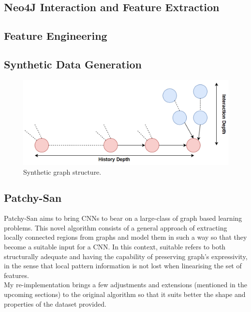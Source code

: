 \subsection{Neo4J Interaction and Feature Extraction}
\subsection{Feature Engineering}
\subsection{Synthetic Data Generation} \label{Synthetic Data Generation}

\begin{figure}[H]
  \centering
  \centerline{\includegraphics[scale = 0.35]{Images/synth_dataset.png}}
  \caption{Synthetic graph structure.}
  \label{synth_dataset}
\end{figure}

\subsection{Patchy-San}

Patchy-San aims to bring CNNs to bear on a large-class of graph based learning problems. This novel algorithm consists of a general approach of extracting locally connected regions from graphs and model them in such a way so that they become a suitable input for a CNN. In this context, suitable refers to both structurally adequate and having the capability of preserving graph's expressivity, in the sense that local pattern information is not lost when linearising the set of features. \\

My re-implementation brings a few adjustments and extensions (mentioned in the upcoming sections) to the original algorithm so that it suits better the shape and properties of the dataset provided. \\

